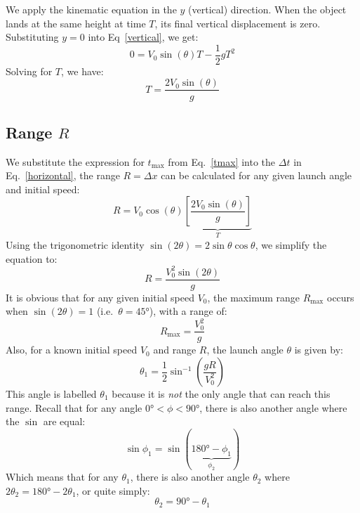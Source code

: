 \documentclass[11pt,titlepage,twoside]{article}
\begin{document}
We apply the kinematic equation in the $y$ (vertical) direction. When the
object lands at the same height at time $T$, its final vertical displacement is
zero. Substituting $y=0$ into Eq~\ref{vertical}, we get:
\begin{equation}
  0=V_0\sin(\theta)T-\frac12gT^2
\end{equation}
Solving for $T$, we have:
\begin{equation}
  \boxed{T=\frac{2V_0\sin(\theta)}g}
  \label{tmax}
\end{equation}

\subsection{Range $R$}
We substitute the expression for $t_\text{max}$ from Eq.~\ref{tmax} into the
$\Delta t$ in Eq.~\ref{horizontal}, the range $R=\Delta x$ can be calculated
for any given launch angle and initial speed:
\begin{equation*}
  R =V_0\cos(\theta)
  \underbrace{\left[\frac{2V_0\sin(\theta)}g\right]}_{T}
\end{equation*}
Using the trigonometric identity $\sin(2\theta)=2\sin\theta\cos\theta$, we
simplify the equation to:
\begin{equation}
  \boxed{R=\frac{V_0^2\sin(2\theta)}g}
\end{equation}
It is obvious that for any given initial speed $V_0$, the maximum range
$R_\text{max}$ occurs when $\sin(2\theta)=1$ (i.e.\ $\theta=\ang{45}$), with a
range of:
\begin{equation}
  \boxed{R_\text{max}=\frac{V_0^2}g}
\end{equation}
Also, for a known initial speed $V_0$ and range $R$, the launch angle $\theta$
is given by:
\begin{equation}
  \boxed{
    \theta_1=\frac12\sin^{-1}\left(\frac{gR}{V_0^2}\right)
  }
\end{equation}
This angle is labelled $\theta_1$ because it is \emph{not} the only angle that
can reach this range. Recall that for any angle $\ang{0}<\phi<\ang{90}$, there
is also another angle where the $\sin$ are equal:
\begin{displaymath}
  \sin\phi_1=\sin(\underbrace{\ang{180}-\phi_1}_{\phi_2})
\end{displaymath}
Which means that for any $\theta_1$, there is also another angle $\theta_2$
where $2\theta_2=\ang{180}-2\theta_1$, or quite simply:
\begin{equation}
  \boxed{\theta_2=\ang{90}-\theta_1}
\end{equation}
\end{document}
